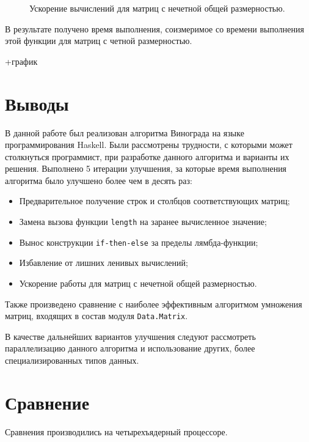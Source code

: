 \documentclass[a4paper,12pt,russian]{article}
\begin{document}
	\begin{figure}[H]
		\caption{Ускорение вычислений для матриц с нечетной общей размерностью.}
		
	\end{figure}
	
	В результате получено время выполнения, соизмеримое со времени выполнения этой функции для матриц с четной размерностью.
	
	+график

	\section{Выводы}
	В данной работе был реализован алгоритма Винограда на языке программирования Haskell. Были рассмотрены трудности, с которыми может столкнуться программист, при разработке данного алгоритма и варианты их решения. Выполнено 5 итерации улучшения, за которые время выполнения алгоритма было улучшено более чем в десять раз:
	\begin{itemize}
		\item Предварительное получение строк и столбцов соответствующих матриц;
		\item Замена вызова функции \texttt{length} на заранее вычисленное значение;
		\item Вынос конструкции \texttt{if-then-else} за пределы лямбда-функции;
		\item Избавление от лишних ленивых вычислений;
		\item Ускорение работы для матриц с нечетной общей размерностью.
	\end{itemize} 
	Также произведено сравнение с наиболее эффективным алгоритмом умножения матриц, входящих в состав модуля \texttt{Data.Matrix}. 
	
	В качестве дальнейших вариантов улучшения следуют рассмотреть параллелизацию данного алгоритма и использование других, более специализированных типов данных.
	
	
	\section{Сравнение}
	Сравнения производились на четырехъядерный процессоре.
	\begin{table}[H]
		\caption{}
		\centering{}\\
	\end{table}
	
	
	
	
\end{document}
